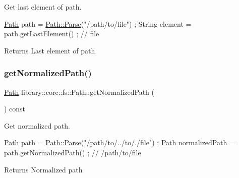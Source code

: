 Get last element of path. 


\begin{DoxyCode}
\hyperlink{classlibrary_1_1core_1_1fs_1_1_path_aabc4240fc08479d1bff6b9753f2b5cc2}{Path} path = \hyperlink{classlibrary_1_1core_1_1fs_1_1_path_a6ba644b6609507e724c217bf2020f5ae}{Path::Parse}(\textcolor{stringliteral}{"/path/to/file"}) ;
String element = path.getLastElement() ; \textcolor{comment}{// file}
\end{DoxyCode}


\begin{DoxyReturn}{Returns}
Last element of path 
\end{DoxyReturn}
\mbox{\label{classlibrary_1_1core_1_1fs_1_1_path_a920b1d062cb1274da811150afafba124}} 
\subsubsection{\texorpdfstring{get\+Normalized\+Path()}{getNormalizedPath()}}
{\footnotesize\ttfamily \hyperlink{classlibrary_1_1core_1_1fs_1_1_path}{Path} library\+::core\+::fs\+::\+Path\+::get\+Normalized\+Path (\begin{DoxyParamCaption}{ }\end{DoxyParamCaption}) const}



Get normalized path. 


\begin{DoxyCode}
\hyperlink{classlibrary_1_1core_1_1fs_1_1_path_aabc4240fc08479d1bff6b9753f2b5cc2}{Path} path = \hyperlink{classlibrary_1_1core_1_1fs_1_1_path_a6ba644b6609507e724c217bf2020f5ae}{Path::Parse}(\textcolor{stringliteral}{"/path/to/../to/./file"}) ;
\hyperlink{classlibrary_1_1core_1_1fs_1_1_path_aabc4240fc08479d1bff6b9753f2b5cc2}{Path} normalizedPath = path.getNormalizedPath() ; \textcolor{comment}{// /path/to/file}
\end{DoxyCode}


\begin{DoxyReturn}{Returns}
Normalized path 
\end{DoxyReturn}
\mbox{\label{classlibrary_1_1core_1_1fs_1_1_path_a0cdc72946505290b9fc2022618f118d9}} 
